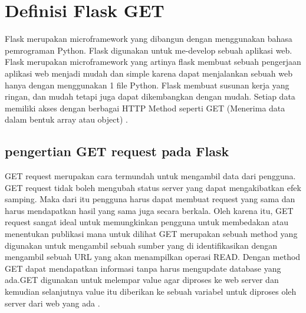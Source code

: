 
\section{Definisi Flask GET}
Flask merupakan microframework yang dibangun dengan menggunakan bahasa pemrograman Python. Flask digunakan untuk me-develop sebuah aplikasi web. Flask merupakan microframework yang artinya flask membuat sebuah pengerjaan aplikasi web menjadi mudah dan simple karena dapat menjalankan sebuah web hanya dengan menggunakan 1 file Python. Flask membuat susunan kerja yang ringan, dan mudah tetapi juga dapat dikembangkan dengan mudah. Setiap data memiliki akses dengan berbagai HTTP Method seperti GET (Menerima data dalam bentuk array atau object) \cite{gunawan2018aplikasi}.
\subsection{pengertian GET request pada Flask}
GET request merupakan cara termundah untuk mengambil data dari pengguna. GET request tidak boleh mengubah status server yang dapat mengakibatkan efek samping.  Maka dari itu pengguna harus dapat membuat request yang sama dan harus mendapatkan hasil yang sama juga secara berkala. Oleh karena itu, GET request sangat ideal untuk memungkinkan pengguna untuk membedakan atau menentukan publikasi mana untuk dilihat\cite{dwyer2016flask}
GET merupakan sebuah method yang digunakan untuk mengambil sebuah sumber yang di identifikasikan dengan mengambil sebuah URL yang akan menampilkan operasi READ. Dengan method GET dapat mendapatkan informasi tanpa harus mengupdate database yang ada.GET digunakan untuk melempar value agar diproses ke web server dan kemudian selanjutnya value itu diberikan ke sebuah variabel untuk diproses oleh server dari web yang ada \cite{alemu2014rest}.
